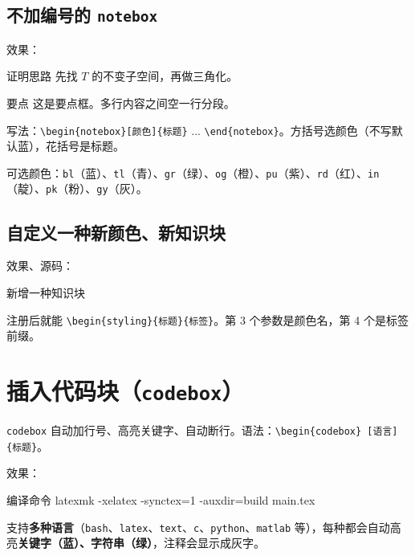 \subsection{不加编号的 \texttt{notebox}}

效果：

\begin{notebox}[og]{证明思路}
先找 $T$ 的不变子空间，再做三角化。
\end{notebox}

\begin{notebox}[pu]{要点}
这是要点框。多行内容之间空一行分段。
\end{notebox}

写法：\texttt{\textbackslash begin\{notebox\}[颜色]\{标题\}} ... \texttt{\textbackslash end\{notebox\}}。方括号选颜色（不写默认蓝），花括号是标题。

可选颜色：\texttt{bl}（蓝）、\texttt{tl}（青）、\texttt{gr}（绿）、\texttt{og}（橙）、\texttt{pu}（紫）、\texttt{rd}（红）、\texttt{in}（靛）、\texttt{pk}（粉）、\texttt{gy}（灰）。

\subsection{自定义一种新颜色、新知识块}

效果、源码：

\begin{codebox}[latex]{新增一种知识块}
\end{codebox}

注册后就能 \texttt{\textbackslash begin\{styling\}\{标题\}\{标签\}}。第 3 个参数是颜色名，第 4 个是标签前缀。

\section{插入代码块（\texttt{codebox}）}

\texttt{codebox} 自动加行号、高亮关键字、自动断行。语法：\texttt{\textbackslash begin\{codebox\}\ [语言]\{标题\}}。

效果：

\begin{codebox}[bash]{编译命令}
latexmk -xelatex -synctex=1 -auxdir=build main.tex
\end{codebox}

支持\textbf{多种语言}（\texttt{bash}、\texttt{latex}、\texttt{text}、\texttt{c}、\texttt{python}、\texttt{matlab} 等），每种都会自动高亮\textbf{关键字（蓝）、字符串（绿）}，注释会显示成灰字。

